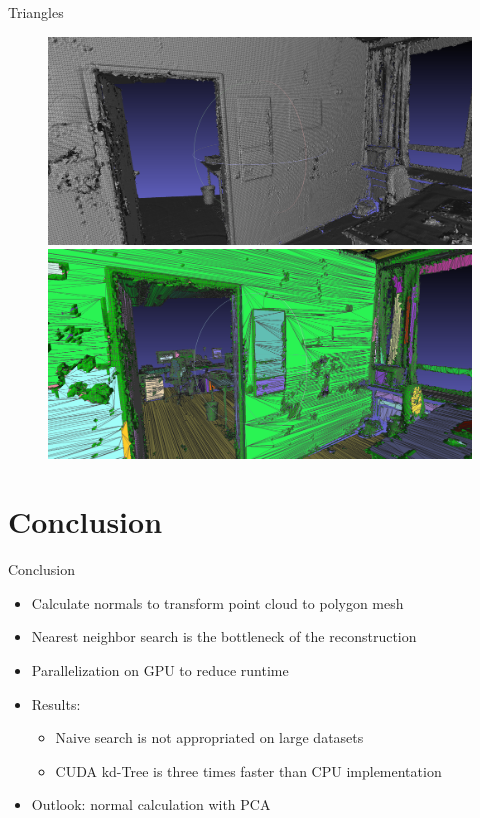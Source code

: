 \documentclass{beamer}
\begin{document}
\begin{frame}{Triangles}
	\begin{figure}
   		\centering
   		\includegraphics[height=0.39\textheight]{police_mesh.png}\\
   		\vspace{0.1cm}
   		\includegraphics[height=0.39\textheight]{police_opt_mesh.png}
  	\end{figure}
\end{frame}

\section{Conclusion}

\begin{frame}{Conclusion}
	\begin{itemize}
		\item Calculate normals to transform point cloud to polygon mesh
		\item Nearest neighbor search is the bottleneck of the reconstruction
		\item Parallelization on GPU to reduce runtime
		\item Results:
		\begin{itemize}
			\item Naive search is not appropriated on large datasets
			\item CUDA kd-Tree is three times faster than CPU implementation
		\end{itemize}
		\item Outlook: normal calculation with PCA
	\end{itemize}
\end{frame}
\end{document}
